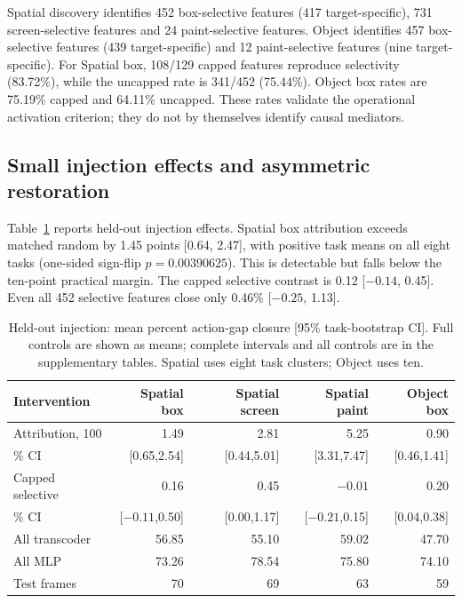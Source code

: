\documentclass{article}
\begin{document}
Spatial discovery identifies 452 box-selective features (417 target-specific), 731 screen-selective features and 24 paint-selective features. Object identifies 457 box-selective features (439 target-specific) and 12 paint-selective features (nine target-specific). For Spatial box, 108/129 capped features reproduce selectivity (83.72\%), while the uncapped rate is 341/452 (75.44\%). Object box rates are 75.19\% capped and 64.11\% uncapped. These rates validate the operational activation criterion; they do not by themselves identify causal mediators.

\subsection{Small injection effects and asymmetric restoration}
Table~\ref{tab:action} reports held-out injection effects. Spatial box attribution exceeds matched random by 1.45 points [0.64, 2.47], with positive task means on all eight tasks (one-sided sign-flip $p=0.00390625$). This is detectable but falls below the ten-point practical margin. The capped selective contrast is 0.12 [$-0.14$, 0.45]. Even all 452 selective features close only 0.46\% [$-0.25$, 1.13].

\begin{table}[t]
\centering\small
\caption{Held-out injection: mean percent action-gap closure [95\% task-bootstrap CI]. Full controls are shown as means; complete intervals and all controls are in the supplementary tables. Spatial uses eight task clusters; Object uses ten.}
\label{tab:action}
\begin{tabular}{lrrrr}
\toprule
Intervention & Spatial box & Spatial screen & Spatial paint & Object box\\
\midrule
Attribution, 100 & 1.49 & 2.81 & 5.25 & 0.90\\
\quad 95\% CI & [0.65,2.54] & [0.44,5.01] & [3.31,7.47] & [0.46,1.41]\\
Capped selective & 0.16 & 0.45 & $-0.01$ & 0.20\\
\quad 95\% CI & [$-0.11$,0.50] & [0.00,1.17] & [$-0.21$,0.15] & [0.04,0.38]\\
All transcoder & 56.85 & 55.10 & 59.02 & 47.70\\
All MLP & 73.26 & 78.54 & 75.80 & 74.10\\
Test frames & 70 & 69 & 63 & 59\\
\bottomrule
\end{tabular}
\end{table}
\end{document}
